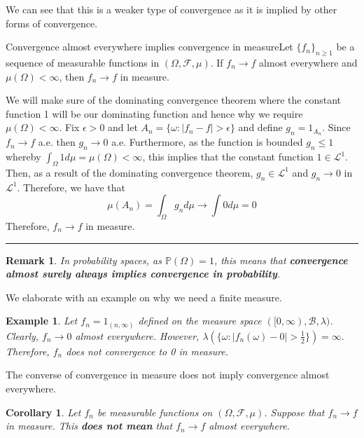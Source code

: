 \documentclass[twoside]{article}
\newtheorem{corollary}[theorem]{Corollary}
\newtheorem{remark}[theorem]{Remark}
\newtheorem{example}[theorem]{Example}
\newenvironment{proof}{{\bf Proof:}}{\hfill\rule{2mm}{2mm}}
\newcommand{\sigmalgebra}{\mathcal{F}}
\newcommand{\borelsigmaalgebra}{\mathcal{B}}
\newcommand{\prob}{\mathbb{P}}
\begin{document}
We can see that this is a weaker type of convergence as it is implied by other forms of convergence.

\begin{theorem_exam}{Convergence almost everywhere implies convergence in measure}{}Let $\{f_n\}_{n \geq 1}$ be a sequence of measurable functions in $(\Omega, \sigmalgebra, \mu)$. If $f_n \rightarrow f$ almost everywhere and $\mu(\Omega) < \infty$, then $f_n \rightarrow f$ in measure.
\end{theorem_exam}

\begin{proof} We will make sure of the dominating convergence theorem where the constant function 1 will be our dominating function and hence why we require $\mu(\Omega) < \infty.$ Fix $\epsilon > 0$ and let $A_n = \{\omega: |f_n - f| > \epsilon\}$ and define $g_n = 1_{A_{n}}.$ Since $f_n \rightarrow f$ a.e. then $g_n \rightarrow 0$ a.e. Furthermore, as the function is bounded $g_n \leq 1$ whereby $\int_{\Omega}1d\mu = \mu(\Omega) < \infty$, this implies that the constant function $1 \in \mathcal{L}^1.$ Then, as a result of the dominating convergence theorem, $g_n \in \mathcal{L}^1$ and $g_n \rightarrow 0$ in $\mathcal{L}^1.$ Therefore, we have that 
$$
\mu(A_n) = \int_{\Omega}g_nd\mu \rightarrow \int 0d\mu = 0
$$
Therefore, $f_n \rightarrow f$ in measure.
\end{proof}

\begin{remark}In probability spaces, as $\prob(\Omega) = 1$, this means that \textbf{convergence almost surely always implies convergence in probability}.
\end{remark}

We elaborate with an example on why we need a finite measure. 
\begin{example}Let $f_n = 1_{(n,\infty)}$ defined on the measure space $([0, \infty), \borelsigmaalgebra, \lambda)$. Clearly, $f_n \rightarrow 0$ almost everywhere. However, $\lambda(\{\omega: |f_n(\omega) - 0| > \frac{1}{2}\}) = \infty.$ Therefore, $f_n$ does not convergence to 0 in measure.
\end{example}

The converse of convergence in measure does not imply convergence almost everywhere.
\begin{corollary}Let $f_n$ be measurable functions on $(\Omega, \mathcal{F}, \mu)$. Suppose that $f_n \rightarrow f$ in measure. This \textbf{does not mean} that $f_n \rightarrow f$ almost everywhere.
\end{corollary}
\end{document}
